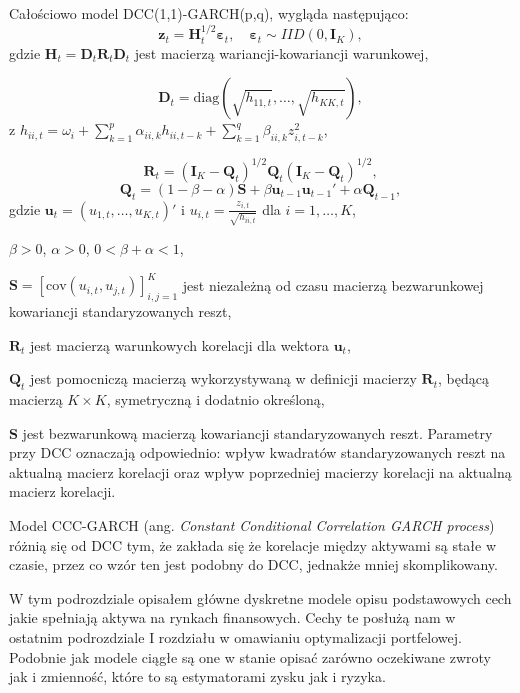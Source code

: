 \begin{enumerate}
Całościowo model DCC(1,1)-GARCH(p,q), wygląda następująco:
\begin{equation}
\mathbf{z}_t = \mathbf{H}_t^{1/2} \boldsymbol{\varepsilon}_t, \quad \boldsymbol{\varepsilon}_t \sim IID(0, \mathbf{I}_K),
\end{equation}
gdzie \(\mathbf{H}_t = \mathbf{D}_t \mathbf{R}_t \mathbf{D}_t\) jest macierzą wariancji-kowariancji warunkowej,

\begin{equation}
\mathbf{D}_t = \text{diag}\left(\sqrt{h_{11,t}}, \ldots, \sqrt{h_{KK,t}}\right),
\end{equation}
z \(h_{ii,t} = \omega_i + \sum_{k=1}^{p} \alpha_{ii,k} h_{ii,t-k} + \sum_{k=1}^{q} \beta_{ii,k} z_{i,t-k}^2\),

\begin{equation}
\mathbf{R}_t = (\mathbf{I}_K - \mathbf{Q}_t)^{1/2} \mathbf{Q}_t (\mathbf{I}_K - \mathbf{Q}_t)^{1/2},
\end{equation}
\begin{equation}
\mathbf{Q}_t = (1 - \beta - \alpha) \mathbf{S} + \beta \mathbf{u}_{t-1} \mathbf{u}_{t-1}' + \alpha \mathbf{Q}_{t-1},
\end{equation}
gdzie \(\mathbf{u}_t = (u_{1,t}, \ldots, u_{K,t})'\) i \(u_{i,t} = \frac{z_{i,t}}{\sqrt{h_{ii,t}}}\) dla \(i = 1, \ldots, K\),

\(\beta > 0\), \(\alpha > 0\), \(0 < \beta + \alpha < 1\),

\(\mathbf{S} = [\text{cov}(u_{i,t}, u_{j,t})]_{i,j=1}^{K}\) jest niezależną od czasu macierzą bezwarunkowej kowariancji standaryzowanych reszt,

\(\mathbf{R}_t\) jest macierzą warunkowych korelacji dla wektora \(\mathbf{u}_t\),

\(\mathbf{Q}_t\) jest pomocniczą macierzą wykorzystywaną w definicji macierzy \(\mathbf{R}_t\), będącą macierzą \(K \times K\), symetryczną i dodatnio określoną,

\(\mathbf{S}\) jest bezwarunkową macierzą kowariancji standaryzowanych reszt.
Parametry przy DCC oznaczają odpowiednio: wpływ kwadratów standaryzowanych reszt na aktualną macierz korelacji oraz wpływ poprzedniej macierzy korelacji na aktualną macierz korelacji. 

Model CCC-GARCH (ang.\textit{ Constant Conditional Correlation GARCH process})
różnią się od DCC tym, że zakłada się że korelacje między aktywami są stałe w czasie, przez co wzór ten jest podobny do DCC, jednakże mniej skomplikowany.

W tym podrozdziale opisałem główne dyskretne modele opisu podstawowych cech jakie spełniają aktywa na rynkach finansowych. Cechy te posłużą nam w ostatnim podrozdziale I rozdziału w omawianiu optymalizacji portfelowej. Podobnie jak modele ciągłe są one w stanie opisać zarówno oczekiwane zwroty jak i zmienność, które to są estymatorami zysku jak i ryzyka. 


\end{enumerate}
